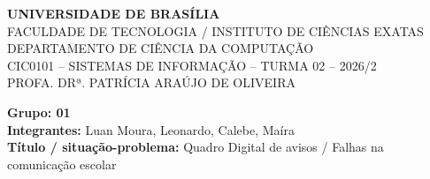 \documentclass[11pt,a4paper]{article}
\begin{document}
\begin{center}
{\small\bfseries UNIVERSIDADE DE BRASÍLIA}\\
FACULDADE DE TECNOLOGIA / INSTITUTO DE CIÊNCIAS EXATAS\\
DEPARTAMENTO DE CIÊNCIA DA COMPUTAÇÃO\\
CIC0101 -- SISTEMAS DE INFORMAÇÃO -- TURMA 02 -- 2026/2\\
PROFA. DRª. PATRÍCIA ARAÚJO DE OLIVEIRA
\end{center}
\makelecturetitle
\begin{center}
\textbf{Grupo: 01}\\[3pt]
\textbf{Integrantes:} Luan Moura, Leonardo, Calebe, Maíra\\[3pt]
\textbf{Título / situação-problema:} Quadro Digital de avisos / Falhas na comunicação escolar
\end{center}
\tableofcontents







\end{document}
